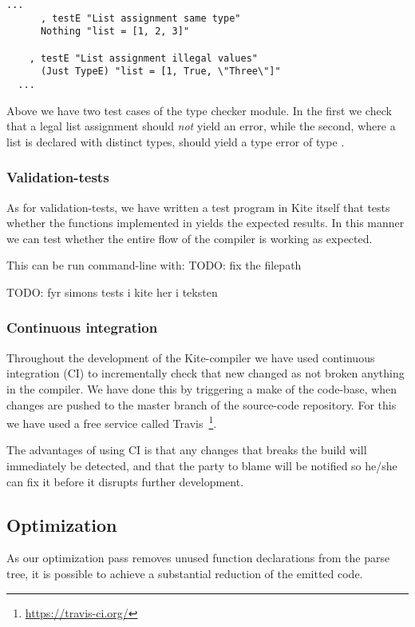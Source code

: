 \begin{lstlisting}[caption=\code{Kite.Test.TypeCheck.hs} snippet]
  ...
      , testE "List assignment same type"
      Nothing "list = [1, 2, 3]"

    , testE "List assignment illegal values"
      (Just TypeE) "list = [1, True, \"Three\"]"
  ...
\end{lstlisting}

Above we have two test cases of the type checker module. In the first
we check that a legal list assignment should \emph{not} yield an
error, while the second, where a list is declared with distinct types,
should yield a type error of type .

\subsubsection{Validation-tests}

As for validation-tests, we have written a test program in Kite itself that tests whether the functions implemented in  yields the expected results. In this manner we can test whether the entire flow of the compiler is working as expected.

This can be run command-line with:  TODO: fix the filepath


TODO: fyr simons tests i kite her i teksten


\subsubsection{Continuous integration}
Throughout the development of the Kite-compiler we have used
continuous integration (CI) to incrementally check that new changed as
not broken anything in the compiler. We have done this by triggering a
make of the code-base, when changes are pushed to the master branch of
the source-code repository. For this we have used a free service
called Travis~\footnote{\url{https://travis-ci.org/}}.

The advantages of using CI is that any changes that breaks the build
will immediately be detected, and that the party to blame will be
notified so he/she can fix it before it disrupts further development.


\subsection{Optimization}
As our optimization pass removes unused function declarations from the parse tree, it is possible to achieve a substantial reduction of the emitted code.

